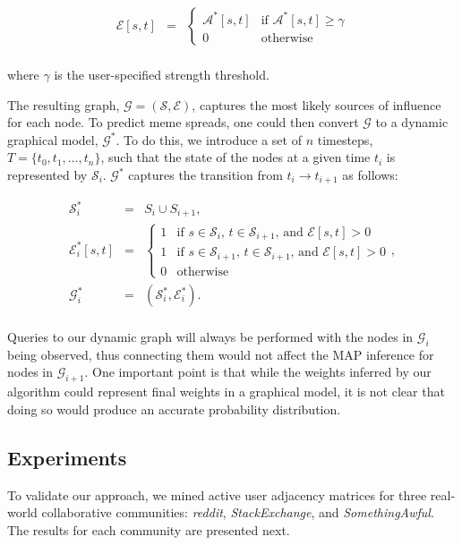 \documentclass{article} %
\begin{document}
$$
\begin{array}{lll}
\mathcal{E}[s,t] &=& \begin{cases}\mathcal{A}^*[s,t] & \text{if }\mathcal{A}^*[s,t] \geq \gamma \\0 &\text{otherwise}\end{cases}\\
\end{array}
$$

where $\gamma$ is the user-specified strength threshold.

The resulting graph, $\mathcal{G} = (\mathcal{S},\mathcal{E})$, captures the most likely sources of influence for each node. To predict meme spreads, one could then convert $\mathcal{G}$ to a dynamic graphical model, $\mathcal{G}^*$. To do this, we introduce a set of $n$ timesteps, $T = \{ t_0, t_1, \dots, t_n\}$, such that the state of the nodes at a given time $t_i$ is represented by $\mathcal{S}_i$. $\mathcal{G}^*$ captures the transition from $t_i \rightarrow t_{i+1}$ as follows:

$$
\begin{array}{lll}
\mathcal{S}^*_i &=& S_i \cup S_{i+1},\\
\mathcal{E}^*_i[s,t] &=& \begin{cases}1 & \text{if } s \in \mathcal{S}_i\text{, }t \in \mathcal{S}_{i+1} \text{, and } \mathcal{E}[s,t] > 0\\
                                      1 & \text{if } s \in \mathcal{S}_{i+1}\text{, }t \in \mathcal{S}_{i+1} \text{, and } \mathcal{E}[s,t] > 0\\
                                      0 & \text{otherwise}\end{cases},\\
\mathcal{G}^*_i &=& (\mathcal{S}^*_i,\mathcal{E}^*_i).\\
\end{array}
$$

Queries to our dynamic graph will always be performed with the nodes in $\mathcal{G}_i$ being observed, thus connecting them would not affect the MAP inference for nodes in $\mathcal{G}_{i+1}$. One important point is that while the weights inferred by our algorithm could represent final weights in a graphical model, it is not clear that doing so would produce an accurate probability distribution.

\subsection{Experiments}
To validate our approach, we mined active user adjacency matrices for three real-world collaborative communities: \textit{reddit}, \textit{StackExchange}, and \textit{SomethingAwful}. The results for each community are presented next.
\end{document}
